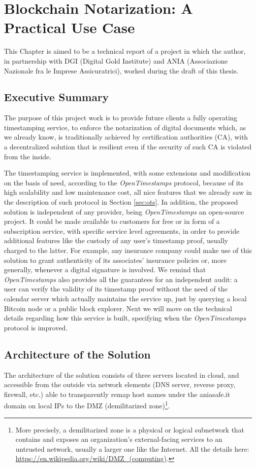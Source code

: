 \chapter{Blockchain Notarization: A Practical Use Case}
\label{chpr:project}
This Chapter is aimed to be a technical report of a project in which the author, in partnership with DGI (Digital Gold Institute) and ANIA (Associazione Nazionale fra le Imprese Assicuratrici), worked during the draft of this thesis.

\bigskip
\section{Executive Summary}
The purpose of this project work is to provide future clients a fully operating timestamping service, to enforce the notarization of digital documents which, as we already know, is traditionally achieved by certification authorities (CA), with a decentralized solution that is resilient even if the security of such CA is violated from the inside.

\bigskip
\noindent
The timestamping service is implemented, with some extensions and modification on the basis of need, according to the \textit{OpenTimestamps} protocol, because of its high scalability and low maintenance cost, all nice features that we already saw in the description of such protocol in Section \ref{sec:ots}. In addition, the proposed solution is independent of any provider, being \textit{OpenTimestamps} an open-source project. It could be made available to customers for free or in form of a subscription service, with specific service level agreements, in order to provide additional features like the custody of any user's timestamp proof, usually charged to the latter. For example, any insurance company could make use of this solution to grant authenticity of its associates' insurance policies or, more generally, whenever a digital signature is involved. We remind that \textit{OpenTimestamps} also provides all the guarantees for an independent audit: a user can verify the validity of its timestamp proof without the need of the calendar server which actually maintains the service up, just by querying a local Bitcoin node or a public block explorer. Next we will move on the technical details regarding how this service is built, specifying when the \textit{OpenTimestamps} protocol is improved.

\bigskip
\section{Architecture of the Solution}
The architecture of the solution consists of three servers located in cloud, and accessible from the outside via network elements (DNS server, reverse proxy, firewall, etc.) able to transparently remap host names under the aniasafe.it domain on local IPs to the DMZ (demilitarized zone)\footnote{More precisely, a demilitarized zone is a physical or logical subnetwork that contains and exposes an organization's external-facing services to an untrusted network, usually a larger one like the Internet. All the details here: \url{https://en.wikipedia.org/wiki/DMZ_(computing)}.}.

